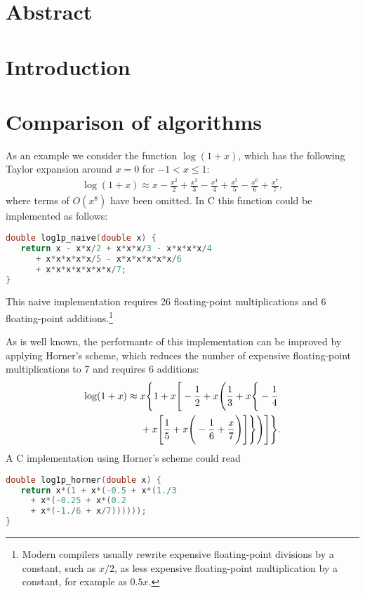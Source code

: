 \documentclass[10pt,DIV16,twocolumn]{scrartcl}
\title{\mytitle}
\author{\myauthor}
\affil{Fachbereich Energie und Biotechnologie, Hochschule Flensburg, Kanzleistraße 91--93, 24943 Flensburg, Germany}
\date{\today}
\begin{document}
\maketitle

\section*{Abstract}

\section{Introduction}

\cite{polylogarithm}

\section{Comparison of algorithms}

As an example we consider the function $\log(1+x)$, which has the
following Taylor expansion around $x=0$ for $-1 < x \leq 1$:
%
\begin{align}
  \log(1+x) \approx x - \frac{x^2}{2} + \frac{x^3}{3} - \frac{x^4}{4} + \frac{x^5}{5} - \frac{x^6}{6} + \frac{x^7}{7},
  \label{eq:taylor}
\end{align}
%
where terms of $O(x^8)$ have been omitted.
In C this function could be implemented as follows:
%
\begin{lstlisting}[language=C]
double log1p_naive(double x) {
   return x - x*x/2 + x*x*x/3 - x*x*x*x/4
      + x*x*x*x*x/5 - x*x*x*x*x*x/6
      + x*x*x*x*x*x*x/7;
}
\end{lstlisting}
%
This naive implementation requires 26 floating-point multiplications
and 6 floating-point additions.\footnote{Modern compilers usually
  rewrite expensive floating-point divisions by a constant, such as
  $x/2$, as less expensive floating-point multiplication by a
  constant, for example as $0.5x$.}

As is well known, the performante of this implementation can be
improved by applying Horner's scheme, which reduces the number of
expensive floating-point multiplications to 7 and requires 6
additions:
%
\begin{align}
  \log(1+x) \approx{}& x \Bigg\{1 + x \Bigg[-\frac{1}{2} + x \Bigg(\frac{1}{3} + x \Bigg\{-\frac{1}{4}  \notag \\
  &+ x \Bigg[\frac{1}{5} + x\Bigg(-\frac{1}{6} + \frac{x}{7}\Bigg)\Bigg]\Bigg\}\Bigg)\Bigg]\Bigg\}.
  \label{eq:horner}
\end{align}
%
A C implementation using Horner's scheme could read
%
\begin{lstlisting}[language=C]
double log1p_horner(double x) {
   return x*(1 + x*(-0.5 + x*(1./3
     + x*(-0.25 + x*(0.2
     + x*(-1./6 + x/7))))));
}
\end{lstlisting}
\end{document}
